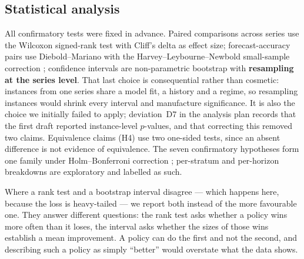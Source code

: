 \subsection{Statistical analysis}

All confirmatory tests were fixed in advance. Paired comparisons across series use the
Wilcoxon signed-rank test with Cliff's delta as effect size; forecast-accuracy pairs use
Diebold--Mariano \citep{diebold1995} with the Harvey--Leybourne--Newbold small-sample
correction \citep{harvey1997}; confidence intervals are non-parametric bootstrap with
\textbf{resampling at the series level}.
That last choice is consequential rather than cosmetic: instances from one series share
a model fit, a history and a regime, so resampling instances would shrink every interval
and manufacture significance. It is also the choice we initially failed to apply; deviation~D7 in the analysis plan records that the first draft reported instance-level
$p$-values, and that correcting this removed two claims. Equivalence claims (H4) use two
one-sided tests, since an absent difference is not evidence of equivalence. The seven
confirmatory hypotheses form one family under Holm--Bonferroni correction
\citep{holm1979}; per-stratum and per-horizon breakdowns are exploratory and labelled as
such.

Where a rank test and a bootstrap interval disagree --- which happens here, because the
loss is heavy-tailed --- we report both instead of the more favourable one. They answer
different questions: the rank test asks whether a policy wins more often than it loses,
the interval asks whether the sizes of those wins establish a mean improvement. A policy
can do the first and not the second, and describing such a policy as simply ``better''
would overstate what the data shows.
